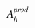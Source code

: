 

    \[\let\par\empty

    
{{{{\miitalic{A}}}\sb{{\miitalic{h}}}\sp{{\miitalic{prod}}}}}


    \]

  